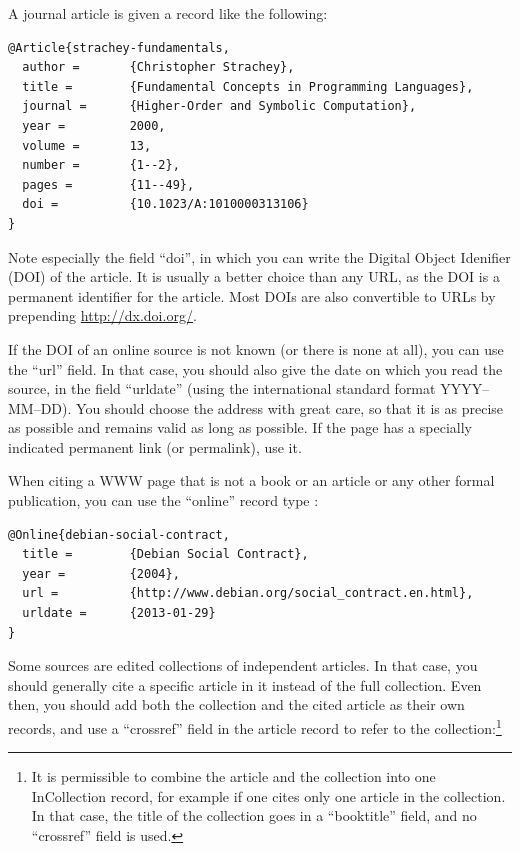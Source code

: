 \documentclass[utf8,english]{gradu3}
\begin{document}
A journal article \parencite[eg.][]{strachey-fundamentals} is given a
record like the following:

\begingroup\footnotesize
\begin{verbatim}
@Article{strachey-fundamentals,
  author =       {Christopher Strachey},
  title =        {Fundamental Concepts in Programming Languages},
  journal =      {Higher-Order and Symbolic Computation},
  year =         2000,
  volume =       13,
  number =       {1--2},
  pages =        {11--49},
  doi =          {10.1023/A:1010000313106}
}
\end{verbatim}
\endgroup

Note especially the field ``doi'', in which you can write the Digital
Object Idenifier (DOI) of the article.  It is usually a better choice
than any URL, as the DOI is a permanent identifier for the article.
Most DOIs are also convertible to URLs by prepending
\url{http://dx.doi.org/}.

If the DOI of an online source is not known (or there is none at all),
you can use the ``url'' field.  In that case, you should also give the
date on which you read the source, in the field ``urldate'' (using the
international standard format YYYY--MM--DD).  You should choose the
address with great care, so that it is as precise as possible and
remains valid as long as possible.  If the page has a specially
indicated permanent link (or permalink), use it.

When citing a WWW page that is not a book or an article or any other
formal publication, you can use the ``online'' record
type \parencite[eg.][]{debian-social-contract}:

\begingroup\footnotesize
\begin{verbatim}
@Online{debian-social-contract,
  title =        {Debian Social Contract},
  year =         {2004},
  url =          {http://www.debian.org/social_contract.en.html},
  urldate =      {2013-01-29}
}
\end{verbatim}
\endgroup

Some sources are edited collections of independent articles.  In that
case, you should generally cite a specific article in
it \parencite[eg.][]{prechelt-credibility} instead of the full
collection.  Even then, you should add both the collection and the
cited article as their own records, and use a ``crossref'' field in
the article record to refer to the collection:\footnote{It is
  permissible to combine the article and the collection into one
  InCollection record, for example if one cites only one article in
  the collection.  In that case, the title of the collection goes in a
  ``booktitle'' field, and no ``crossref'' field is used.}
\end{document}
